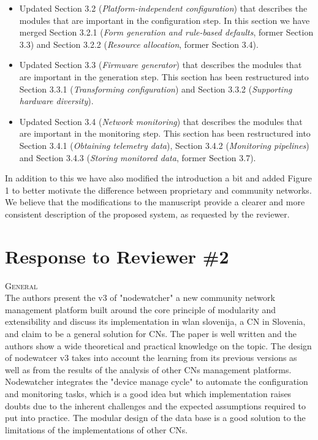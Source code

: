 \documentclass[12pt,twoside,a4paper]{report}
\begin{document}
\begin{itemize}
\item Updated Section 3.2 (\textit{Platform-independent configuration}) that describes the modules that are important in the configuration step.
In this section we have merged Section 3.2.1 (\textit{Form generation and rule-based defaults}, former Section 3.3) and Section 3.2.2 (\textit{Resource allocation}, former Section 3.4).
\item Updated Section 3.3 (\textit{Firmware generator}) that describes the modules that are important in the generation step.
This section has been restructured into Section 3.3.1 (\textit{Transforming configuration}) and Section 3.3.2 (\textit{Supporting hardware diversity}).
\item Updated Section 3.4 (\textit{Network monitoring}) that describes the modules that are important in the monitoring step.
This section has been restructured into Section 3.4.1 (\textit{Obtaining telemetry data}), Section 3.4.2 (\textit{Monitoring pipelines}) and Section 3.4.3 (\textit{Storing monitored data}, former Section 3.7).
\end{itemize}

In addition to this we have also modified the introduction a bit and added Figure 1 to better motivate the difference between proprietary and community networks. We believe that the modifications to the manuscript provide a clearer and more consistent description of the proposed system, as requested by the reviewer.

\newpage

\section*{Response to Reviewer \#2}

\vspace{0.5cm}\noindent\textsc{General}\\
The authors present the v3 of "nodewatcher" a new community network management platform built around the core principle of modularity and extensibility and discuss its implementation in wlan slovenija, a CN in Slovenia, and claim to be a general solution for CNs. The paper is well written and the authors show a wide theoretical and practical knowledge on the topic. The design of nodewatcer v3 takes into account the learning from its previous versions as well as from the results of the analysis of other CNs management platforms. Nodewatcher integrates the "device manage cycle" to automate the configuration and monitoring tasks, which is a good idea but which implementation raises doubts due to the inherent challenges and the expected assumptions required to put into practice. The modular design of the data base is a good solution to the limitations of the implementations of other CNs.
\end{document}
